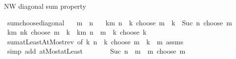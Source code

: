 \begin{isabellebody}
\begin{isamarkuptext}
NW diagonal sum property%
\end{isamarkuptext}\isamarkuptrue%
\isamarkupfalse%
\ sum{\isacharunderscore}{\kern0pt}choose{\isacharunderscore}{\kern0pt}diagonal{\isacharcolon}{\kern0pt}\isanewline
\ \ \ {\isachardoublequoteopen}m\ {\isasymle}\ n{\isachardoublequoteclose}\isanewline
\ \ \ {\isachardoublequoteopen}{\isacharparenleft}{\kern0pt}{\isasymSum}k{\isasymle}m{\isachardot}{\kern0pt}\ {\isacharparenleft}{\kern0pt}n\ {\isacharminus}{\kern0pt}\ k{\isacharparenright}{\kern0pt}\ choose\ {\isacharparenleft}{\kern0pt}m\ {\isacharminus}{\kern0pt}\ k{\isacharparenright}{\kern0pt}{\isacharparenright}{\kern0pt}\ {\isacharequal}{\kern0pt}\ Suc\ n\ choose\ m{\isachardoublequoteclose}\isanewline
%
\isadelimproof
%
\endisadelimproof
%
\isatagproof
{}\isamarkupfalse%
\ {\isacharminus}{\kern0pt}\isanewline
\ \ \isamarkupfalse%
\ {\isachardoublequoteopen}{\isacharparenleft}{\kern0pt}{\isasymSum}k{\isasymle}m{\isachardot}{\kern0pt}\ {\isacharparenleft}{\kern0pt}n{\isacharminus}{\kern0pt}k{\isacharparenright}{\kern0pt}\ choose\ {\isacharparenleft}{\kern0pt}m\ {\isacharminus}{\kern0pt}\ k{\isacharparenright}{\kern0pt}{\isacharparenright}{\kern0pt}\ {\isacharequal}{\kern0pt}\ {\isacharparenleft}{\kern0pt}{\isasymSum}k{\isasymle}m{\isachardot}{\kern0pt}\ {\isacharparenleft}{\kern0pt}n\ {\isacharminus}{\kern0pt}\ m\ {\isacharplus}{\kern0pt}\ k{\isacharparenright}{\kern0pt}\ choose\ k{\isacharparenright}{\kern0pt}{\isachardoublequoteclose}\isanewline
\ \ \ \ \isamarkupfalse%
\ sum{\isachardot}{\kern0pt}atLeastAtMost{\isacharunderscore}{\kern0pt}rev\ {\isacharbrackleft}{\kern0pt}of\ {\isachardoublequoteopen}{\isasymlambda}k{\isachardot}{\kern0pt}\ {\isacharparenleft}{\kern0pt}n\ {\isacharminus}{\kern0pt}\ k{\isacharparenright}{\kern0pt}\ choose\ {\isacharparenleft}{\kern0pt}m\ {\isacharminus}{\kern0pt}\ k{\isacharparenright}{\kern0pt}{\isachardoublequoteclose}\ {}\ m{\isacharbrackright}{\kern0pt}\ assms\isanewline
\ \ \ \ \isamarkupfalse%
\ {\isacharparenleft}{\kern0pt}simp\ add{\isacharcolon}{\kern0pt}\ atMost{\isacharunderscore}{\kern0pt}atLeast{}{\isacharparenright}{\kern0pt}\isanewline
\ \ \isamarkupfalse%
\ \isamarkupfalse%
\ {\isachardoublequoteopen}{\isasymdots}\ {\isacharequal}{\kern0pt}\ Suc\ {\isacharparenleft}{\kern0pt}n\ {\isacharminus}{\kern0pt}\ m\ {\isacharplus}{\kern0pt}\ m{\isacharparenright}{\kern0pt}\ choose\ m{\isachardoublequoteclose}\isanewline

\end{isabellebody}
